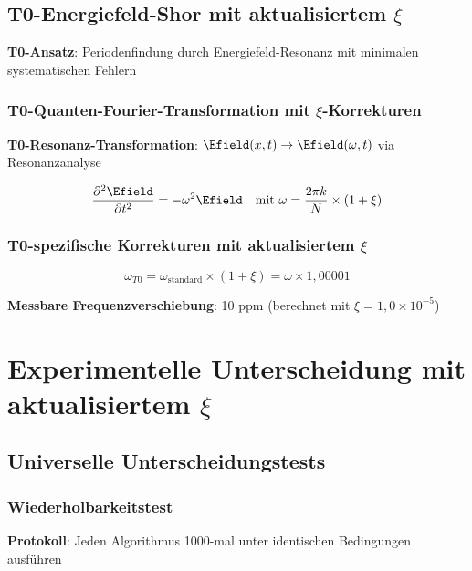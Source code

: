 	\subsection{T0-Energiefeld-Shor mit aktualisiertem $\xi$}
	
	\textbf{T0-Ansatz}: Periodenfindung durch Energiefeld-Resonanz mit minimalen systematischen Fehlern
	
	\subsubsection{T0-Quanten-Fourier-Transformation mit $\xi$-Korrekturen}
	
	\textbf{T0-Resonanz-Transformation}: $\Efield(x,t) \rightarrow \Efield(\omega,t)$ via Resonanzanalyse
	
	\begin{equation}
		\frac{\partial^2 \Efield}{\partial t^2} = -\omega^2 \Efield \quad \text{mit } \omega = \frac{2\pi k}{N} \times (1 + \xi)
	\end{equation}
	
	\subsubsection{T0-spezifische Korrekturen mit aktualisiertem $\xi$}
	
	\begin{equation}
		\omega_{T0} = \omega_{\text{standard}} \times (1 + \xi) = \omega \times 1,00001
	\end{equation}
	
	\textbf{Messbare Frequenzverschiebung}: 10 ppm (berechnet mit $\xi = 1,0 \times 10^{-5}$)
	
	\section{Experimentelle Unterscheidung mit aktualisiertem $\xi$}
	
	\subsection{Universelle Unterscheidungstests}
	
	\subsubsection{Wiederholbarkeitstest}
	
	\textbf{Protokoll}: Jeden Algorithmus 1000-mal unter identischen Bedingungen ausführen
	
